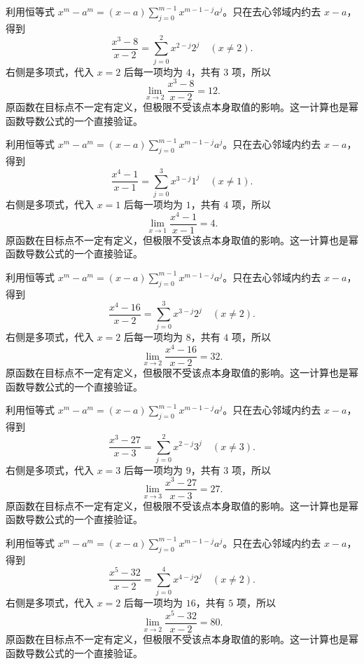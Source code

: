 \documentclass[12pt,fontset=fandol]{ctexart}
\begin{document}
\begin{solve}\label{ans:c3q3}
利用恒等式 $x^m-a^m=(x-a)\sum_{j=0}^{m-1}x^{m-1-j}a^j$。只在去心邻域内约去 $x-a$，得到
\[
\frac{x^{3}-8}{x-2}=\sum_{j=0}^{2}x^{2-j}2^j\quad(x\ne 2).
\]
右侧是多项式，代入 $x=2$ 后每一项均为 $4$，共有 $3$ 项，所以
\[
\lim_{x\to 2}\frac{x^{3}-8}{x-2}=12.
\]
原函数在目标点不一定有定义，但极限不受该点本身取值的影响。这一计算也是幂函数导数公式的一个直接验证。
\end{solve}

\begin{solve}\label{ans:c3q4}
利用恒等式 $x^m-a^m=(x-a)\sum_{j=0}^{m-1}x^{m-1-j}a^j$。只在去心邻域内约去 $x-a$，得到
\[
\frac{x^{4}-1}{x-1}=\sum_{j=0}^{3}x^{3-j}1^j\quad(x\ne 1).
\]
右侧是多项式，代入 $x=1$ 后每一项均为 $1$，共有 $4$ 项，所以
\[
\lim_{x\to 1}\frac{x^{4}-1}{x-1}=4.
\]
原函数在目标点不一定有定义，但极限不受该点本身取值的影响。这一计算也是幂函数导数公式的一个直接验证。
\end{solve}

\begin{solve}\label{ans:c3q5}
利用恒等式 $x^m-a^m=(x-a)\sum_{j=0}^{m-1}x^{m-1-j}a^j$。只在去心邻域内约去 $x-a$，得到
\[
\frac{x^{4}-16}{x-2}=\sum_{j=0}^{3}x^{3-j}2^j\quad(x\ne 2).
\]
右侧是多项式，代入 $x=2$ 后每一项均为 $8$，共有 $4$ 项，所以
\[
\lim_{x\to 2}\frac{x^{4}-16}{x-2}=32.
\]
原函数在目标点不一定有定义，但极限不受该点本身取值的影响。这一计算也是幂函数导数公式的一个直接验证。
\end{solve}

\begin{solve}\label{ans:c3q6}
利用恒等式 $x^m-a^m=(x-a)\sum_{j=0}^{m-1}x^{m-1-j}a^j$。只在去心邻域内约去 $x-a$，得到
\[
\frac{x^{3}-27}{x-3}=\sum_{j=0}^{2}x^{2-j}3^j\quad(x\ne 3).
\]
右侧是多项式，代入 $x=3$ 后每一项均为 $9$，共有 $3$ 项，所以
\[
\lim_{x\to 3}\frac{x^{3}-27}{x-3}=27.
\]
原函数在目标点不一定有定义，但极限不受该点本身取值的影响。这一计算也是幂函数导数公式的一个直接验证。
\end{solve}

\begin{solve}\label{ans:c3q7}
利用恒等式 $x^m-a^m=(x-a)\sum_{j=0}^{m-1}x^{m-1-j}a^j$。只在去心邻域内约去 $x-a$，得到
\[
\frac{x^{5}-32}{x-2}=\sum_{j=0}^{4}x^{4-j}2^j\quad(x\ne 2).
\]
右侧是多项式，代入 $x=2$ 后每一项均为 $16$，共有 $5$ 项，所以
\[
\lim_{x\to 2}\frac{x^{5}-32}{x-2}=80.
\]
原函数在目标点不一定有定义，但极限不受该点本身取值的影响。这一计算也是幂函数导数公式的一个直接验证。
\end{solve}
\end{document}
